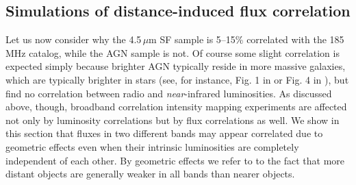 \documentclass[numberedappendix]{emulateapj}
\begin{document}
\subsection{Simulations of distance-induced flux correlation}
\label{sec:fluxcorsims}
Let us now consider why the 4.5\,$\mu$m SF sample is 5--15\% correlated with the 185\,MHz catalog, while the AGN sample is not. Of course some slight correlation is expected simply because brighter AGN typically reside in more massive galaxies, which are typically brighter in stars (see, for instance, Fig. 1 in \citep{seymour07} or Fig. 4 in \citep{Willott03}), but \citet{mauch07} find no correlation between radio and \textit{near}-infrared luminosities. As discussed above, though, broadband correlation intensity mapping experiments are affected not only by luminosity correlations but by flux correlations as well. We show in this section that fluxes in two different bands may appear correlated due to geometric effects even when their intrinsic luminosities are completely independent of each other. By geometric effects we refer to to the fact that more distant objects are generally weaker in all bands than nearer objects. 
\end{document}
